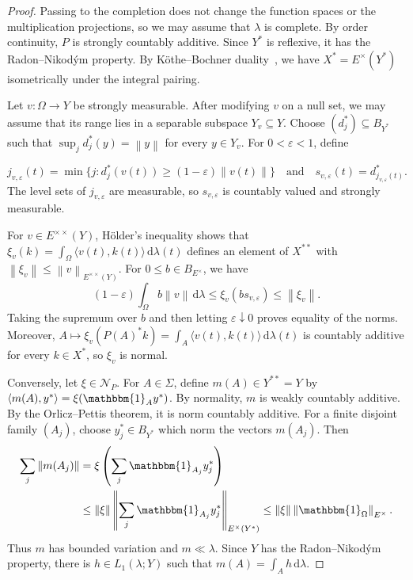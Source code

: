 \documentclass[11pt,leqno]{amsart}
\theoremstyle{compact}
\numberwithin{equation}{section}
\theoremstyle{compactremark}
\theoremstyle{compact}
\newcommand{\1}{\mathbbm{1}}
\newcommand{\rmd}{\mathrm{d}}
\newcommand{\norm}[1]{\left\|#1\right\|}
\newcommand{\inp}[2]{\langle #1,#2\rangle}
\begin{document}
\begin{proof}
Passing to the completion does not change the function spaces or the multiplication projections, so we may assume that $\lambda$ is complete. By order continuity, $P$ is strongly countably additive.
\begingroup
Since $Y^*$ is reflexive, it has the Radon--Nikod\'ym property. By K\"othe--Bochner duality~\cite[proof of Corollary~21]{Hardtke2013}, we have $X^*=E^\times(Y^*)$ isometrically under the integral pairing.

Let $v\colon\Omega\to Y$ be strongly measurable. After modifying $v$ on a null set, we may assume that its range lies in a separable subspace $Y_v\subseteq Y$. Choose $(d_j^*)\subseteq B_{Y^*}$ such that $\sup_jd_j^*(y)=\norm{y}$ for every $y\in Y_v$. For $0<\varepsilon<1$, define
\par\endgroup
\[
j_{v,\varepsilon}(t)=\min\{j:d_j^*(v(t))\geq(1-\varepsilon)\norm{v(t)}\}\quad\text{and}\quad s_{v,\varepsilon}(t)=d_{j_{v,\varepsilon}(t)}^*.
\]
The level sets of $j_{v,\varepsilon}$ are measurable, so $s_{v,\varepsilon}$ is countably valued and strongly measurable.

For $v\in E^{\times\times}(Y)$, H\"older's inequality shows that $\xi_v(k)=\int_\Omega\inp{v(t)}{k(t)}\,\rmd\lambda(t)$ defines an element of $X^{**}$ with $\norm{\xi_v}\leq\norm{v}_{E^{\times\times}(Y)}$. For $0\leq b\in B_{E^\times}$, we have
\[
(1-\varepsilon)\int_\Omega b\norm{v}\,\rmd\lambda\leq\xi_v(bs_{v,\varepsilon})\leq\norm{\xi_v}.
\]
Taking the supremum over $b$ and then letting $\varepsilon\downarrow0$ proves equality of the norms. Moreover, $A\mapsto\xi_v(P(A)^*k)=\int_A\inp{v(t)}{k(t)}\,\rmd\lambda(t)$ is countably additive for every $k\in X^*$, so $\xi_v$ is normal.

Conversely, let $\xi\in \mathcal N_P$. For $A\in\Sigma$, define $m(A)\in Y^{**}=Y$ by $\inp{m(A)}{y^*}=\xi(\1_Ay^*)$. By normality, $m$ is weakly countably additive. By the Orlicz--Pettis theorem, it is norm countably additive. For a finite disjoint family $(A_j)$, choose $y_j^*\in B_{Y^*}$ which norm the vectors $m(A_j)$. Then
\begin{align*}
\sum_j\norm{m(A_j)}
&=\xi\left(\sum_j\1_{A_j}y_j^*\right)\\
&\leq\norm{\xi}\left\|\sum_j\1_{A_j}y_j^*\right\|_{E^\times(Y^*)}
 \leq\norm{\xi}\norm{\1_\Omega}_{E^\times}.
\end{align*}
Thus $m$ has bounded variation and $m\ll\lambda$. Since $Y$ has the Radon--Nikod\'ym property, there is $h\in L_1(\lambda;Y)$ such that $m(A)=\int_Ah\,\rmd\lambda$.


\end{proof}
\end{document}
